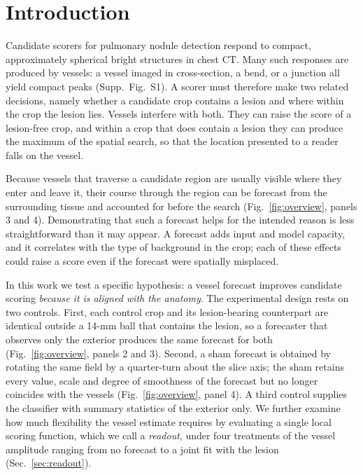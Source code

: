 \section{Introduction}
\label{sec:intro}
Candidate scorers for pulmonary nodule detection respond to compact, approximately spherical bright structures in chest CT. Many such responses are produced by vessels: a vessel imaged in cross-section, a bend, or a junction all yield compact peaks (Supp.~Fig.~S1). A scorer must therefore make two related decisions, namely whether a candidate crop contains a lesion and where within the crop the lesion lies. Vessels interfere with both. They can raise the score of a lesion-free crop, and within a crop that does contain a lesion they can produce the maximum of the spatial search, so that the location presented to a reader falls on the vessel.

Because vessels that traverse a candidate region are usually visible where they enter and leave it, their course through the region can be forecast from the surrounding tissue and accounted for before the search (Fig.~\ref{fig:overview}, panels 3 and 4). Demonstrating that such a forecast helps for the intended reason is less straightforward than it may appear. A forecast adds input and model capacity, and it correlates with the type of background in the crop; each of these effects could raise a score even if the forecast were spatially misplaced.

In this work we test a specific hypothesis: a vessel forecast improves candidate scoring \emph{because it is aligned with the anatomy}. The experimental design rests on two controls. First, each control crop and its lesion-bearing counterpart are identical outside a 14-mm ball that contains the lesion, so a forecaster that observes only the exterior produces the same forecast for both (Fig.~\ref{fig:overview}, panels 2 and 3). Second, a sham forecast is obtained by rotating the same field by a quarter-turn about the slice axis; the sham retains every value, scale and degree of smoothness of the forecast but no longer coincides with the vessels (Fig.~\ref{fig:overview}, panel 4). A third control supplies the classifier with summary statistics of the exterior only. We further examine how much flexibility the vessel estimate requires by evaluating a single local scoring function, which we call a \emph{readout}, under four treatments of the vessel amplitude ranging from no forecast to a joint fit with the lesion (Sec.~\ref{sec:readout}).

